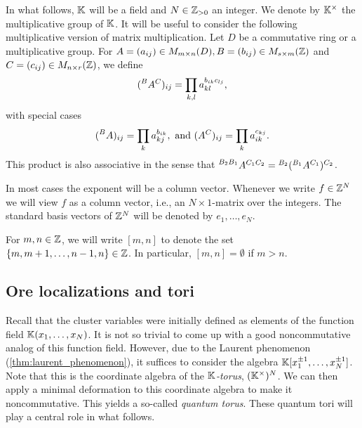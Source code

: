 In what follows, $\mathbb{K}$ will be a field and $N \in \mathbb{Z}_{> 0}$ an integer. We denote by
$\mathbb{K}^\times$ the multiplicative group of $\mathbb{K}$. It will be useful to consider the
following multiplicative version of matrix multiplication. Let $D$ be a commutative
ring or a multiplicative group. For $A = (a_{ij}) \in M_{m \times n}(D), B = (b_{ij})
	\in M_{s \times m}(\mathbb{Z})$ and $C = (c_{ij}) \in M_{n \times r} (\mathbb{Z})$, we define
\begin{equation*}
	(\prescript{B}{}{A}^C)_{ij} = \prod_{k, l} a_{kl}^{b_{ik}c_{lj}},
\end{equation*}
%
with special cases
\begin{equation*}
	(\prescript{B}{}{A})_{ij} = \prod_{k} a_{kj}^{b_{ik}}, \text{ and }	(A^C)_{ij} = \prod_{k} a_{ik}^{c_{kj}}.
\end{equation*}
%
This product is also associative in the sense that $\prescript{B_2 B_1}{}{A}^{C_1 C_2}
	= \prescript{B_2}{}{}(\prescript{B_1}{}{}A^{C_1})^{C_2}$.

In most cases the exponent will be a column vector. Whenever we write $f \in \mathbb{Z}^N$ we
will view $f$ as a column vector, i.e., an $N \times 1$-matrix over the integers. The
standard basis vectors of $\mathbb{Z}^N$ will be denoted by $e_1, \dots, e_N$.

For $m, n \in \mathbb{Z}$, we will write $[m, n]$ to denote the set $\{m, m+1, \dots, n-1,
	n\} \in \mathbb{Z}$. In particular, $[m, n] = \emptyset$ if $m > n$.

\subsection{Ore localizations and tori}

Recall that the cluster variables were initially defined as elements of the function
field $\mathbb{K}(x_1, \dots, x_N)$. It is not so trivial to come up with a good
noncommutative analog of this function field. However, due to the Laurent phenomenon
(\cref{thm:laurent_phenomenon}), it suffices to consider the algebra $\mathbb{K}[x_1^{\pm 1},
	\dots, x_N^{\pm 1}]$. Note that this is the coordinate algebra of the
\emph{$\mathbb{K}$-torus}, $(\mathbb{K}^\times)^N$. We can then apply a minimal
deformation to this coordinate algebra to make it noncommutative. This yields a
so-called \emph{quantum torus}. These quantum tori will play a
central role in what follows.

